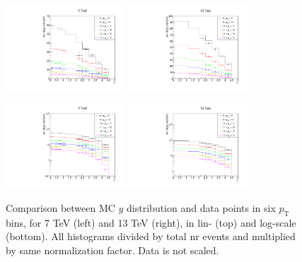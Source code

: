 \documentclass{article}
\newcommand{\pt}{p_\text{T}}
\begin{document}
\clearpage

\begin{figure}[h!]
\centering
\includegraphics[width = 0.4\textwidth]{plots/y_dist_7.pdf}
\includegraphics[width = 0.4\textwidth]{plots/y_dist_13.pdf}

\includegraphics[width = 0.4\textwidth]{plots/y_dist_log_7.pdf}
\includegraphics[width = 0.4\textwidth]{plots/y_dist_log_13.pdf}
\caption{Comparison between MC $y$ distribution and data points in six  $\pt$ bins, for 7 TeV (left) and 13 TeV (right), in lin- (top) and log-scale (bottom). All histograms divided by total nr events and multiplied by same normalization factor. Data is not scaled.}\label{f:y_comp}
\end{figure}

\clearpage
\end{document}

